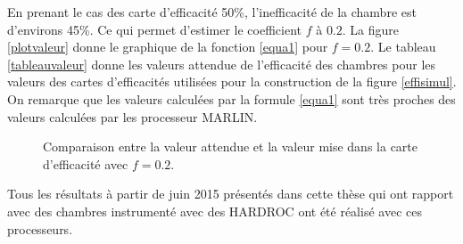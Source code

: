 En prenant le cas des carte d'efficacité 50\%, l'inefficacité de la chambre est d'environs 45\%. Ce qui permet d'estimer le coefficient $f$ à $0.2$. La figure \ref{plotvaleur} donne le graphique de la fonction \ref{equa1} pour $f=0.2$. Le tableau \ref{tableauvaleur} donne les valeurs attendue de l'efficacité des chambres pour les valeurs des cartes d'efficacités utilisées pour la construction de la figure \ref{effisimul}. On remarque que les valeurs calculées par la formule \ref{equa1} sont très proches des valeurs calculées par les processeur MARLIN.

	\begin{figure}[ht!]
    \hfill
	\caption{Comparaison entre la valeur attendue et la valeur mise dans la carte d'efficacité avec $f=0.2$. }
	\label{Comparaison}
\end{figure}

 Tous les résultats à partir de juin 2015 présentés dans cette thèse qui ont rapport avec des chambres instrumenté avec des HARDROC ont été réalisé avec ces processeurs.

